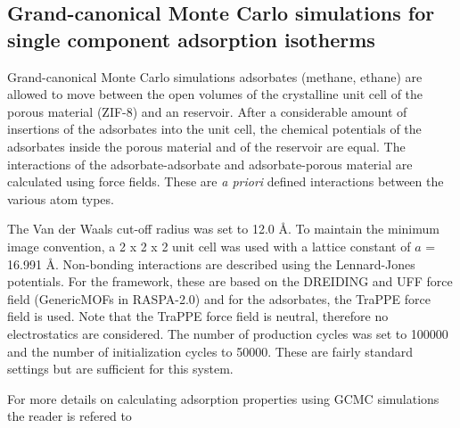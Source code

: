 \documentclass{article}
\begin{document}
\subsection{Grand-canonical Monte Carlo simulations for single component adsorption isotherms}
\label{sec:gcmc_simulations} 
Grand-canonical Monte Carlo simulations adsorbates (methane, ethane) are allowed to move between the open volumes of the crystalline unit cell of the porous material (ZIF-8) and an reservoir. After a considerable amount of insertions of the adsorbates into the unit cell, the chemical potentials of the adsorbates inside the porous material and of the reservoir are equal. The interactions of the adsorbate-adsorbate and adsorbate-porous material are calculated using force fields. These are \textit{a priori} defined interactions between the various atom types.

The Van der Waals cut-off radius was set to 12.0 {\AA}. To maintain the minimum image convention, a 2 x 2 x 2 unit cell was used with a lattice constant of $a$ = 16.991 \AA. Non-bonding interactions are described using the Lennard-Jones potentials. For the framework, these are based on the DREIDING and UFF force field (GenericMOFs in RASPA-2.0) and for the adsorbates, the TraPPE force field is used. Note that the TraPPE force field is neutral, therefore no electrostatics are considered. The number of production cycles was set to 100000 and the number of initialization cycles to 50000. These are fairly standard settings but are sufficient for this system.  

For more details on calculating adsorption properties using GCMC simulations the reader is refered to \cite{Frenkel2001,Dubbeldam2013,Dubbeldam2015}









\end{document}
